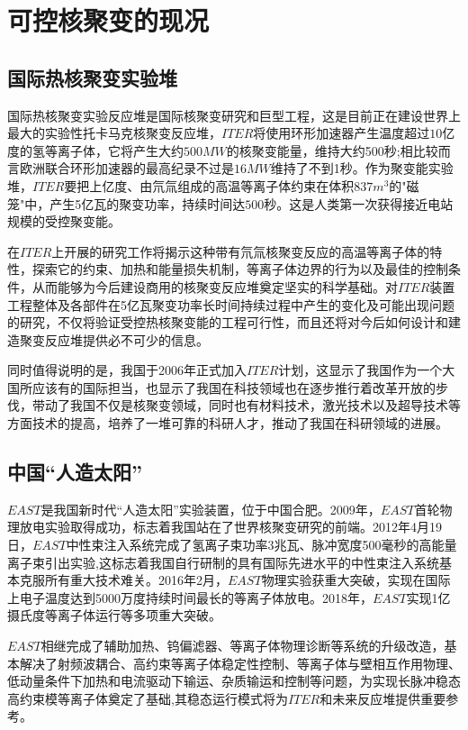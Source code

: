 \chapter{可控核聚变的现况}
\section{国际热核聚变实验堆}
国际热核聚变实验反应堆是国际核聚变研究和巨型工程，这是目前正在建设世界上最大的实验性托卡马克核聚变反应堆，$ITER$将使用环形加速器产生温度超过$10$亿度的氢等离子体，它将产生大约$500MW$的核聚变能量，维持大约500秒;相比较而言欧洲联合环形加速器的最高纪录不过是$16MW$维持了不到1秒。作为聚变能实验堆，$ITER$要把上亿度、由氘氚组成的高温等离子体约束在体积$837m^{3}$的"磁笼"中，产生5亿瓦的聚变功率，持续时间达$500$秒。这是人类第一次获得接近电站规模的受控聚变能。


在$ITER$上开展的研究工作将揭示这种带有氘氚核聚变反应的高温等离子体的特性，探索它的约束、加热和能量损失机制，等离子体边界的行为以及最佳的控制条件，从而能够为今后建设商用的核聚变反应堆奠定坚实的科学基础。对$ITER$装置工程整体及各部件在5亿瓦聚变功率长时间持续过程中产生的变化及可能出现问题的研究，不仅将验证受控热核聚变能的工程可行性，而且还将对今后如何设计和建造聚变反应堆提供必不可少的信息。


同时值得说明的是，我国于2006年正式加入$ITER$计划，这显示了我国作为一个大国所应该有的国际担当，也显示了我国在科技领域也在逐步推行着改革开放的步伐，带动了我国不仅是核聚变领域，同时也有材料技术，激光技术以及超导技术等方面技术的提高，培养了一堆可靠的科研人才，推动了我国在科研领域的进展。
\section{中国“人造太阳”}
$EAST$是我国新时代“人造太阳”实验装置，位于中国合肥。2009年，$EAST$首轮物理放电实验取得成功，标志着我国站在了世界核聚变研究的前端。2012年4月19日，$EAST$中性束注入系统完成了氢离子束功率3兆瓦、脉冲宽度500毫秒的高能量离子束引出实验,这标志着我国自行研制的具有国际先进水平的中性束注入系统基本克服所有重大技术难关。2016年2月，$EAST$物理实验获重大突破，实现在国际上电子温度达到5000万度持续时间最长的等离子体放电。2018年，$EAST$实现1亿摄氏度等离子体运行等多项重大突破\cite{chinaEAST2}。


$EAST$相继完成了辅助加热、钨偏滤器、等离子体物理诊断等系统的升级改造，基本解决了射频波耦合、高约束等离子体稳定性控制、等离子体与壁相互作用物理、低动量条件下加热和电流驱动下输运、杂质输运和控制等问题，为实现长脉冲稳态高约束模等离子体奠定了基础,其稳态运行模式将为$ITER$和未来反应堆提供重要参考\cite{chinaEAST1}。


